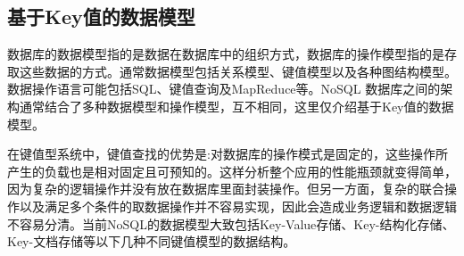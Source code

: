 \documentclass[11pt, a4paper, oneside]{ctexart}
\begin{document}
\subsection{基于Key值的数据模型}
数据库的数据模型指的是数据在数据库中的组织方式，数据库的操作模型指的是存取这些数据的方式。通常数据模型包括关系模型、键值模型以及各种图结构模型。数据操作语言可能包括SQL、键值查询及MapReduce等。NoSQL 数据库之间的架构通常结合了多种数据模型和操作模型，互不相同，这里仅介绍基于Key值的数据模型。

在键值型系统中，键值查找的优势是:对数据库的操作模式是固定的，这些操作所产生的负载也是相对固定且可预知的。这样分析整个应用的性能瓶颈就变得简单，因为复杂的逻辑操作并没有放在数据库里面封装操作。但另一方面，复杂的联合操作以及满足多个条件的取数据操作并不容易实现，因此会造成业务逻辑和数据逻辑不容易分清。当前NoSQL的数据模型大致包括Key-Value存储、Key-结构化存储、Key-文档存储等以下几种不同键值模型的数据结构。
\end{document}
